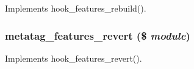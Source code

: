 \label{metatag_8features_8inc_a968c130a7b02c7c616dabc8eb54b84f1}
Implements hook\_\-features\_\-rebuild(). \hypertarget{metatag_8features_8inc_ae36fc91390d329f8561acc8df4b91f72}{
\subsubsection[{metatag\_\-features\_\-revert}]{\setlength{\rightskip}{0pt plus 5cm}metatag\_\-features\_\-revert (\$ {\em module})}}
\label{metatag_8features_8inc_ae36fc91390d329f8561acc8df4b91f72}
Implements hook\_\-features\_\-revert(). 